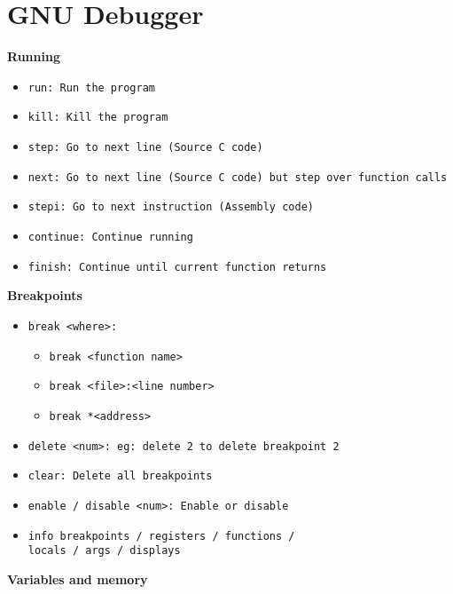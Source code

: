 \section{GNU Debugger}

\textbf{Running}
\begin{itemize}[noitemsep, topsep=1pt]
    \item \tt{run}: Run the program
    \item \tt{kill}: Kill the program
    \item \tt{step}: Go to next line (Source C code)
    \item \tt{next}: Go to next line (Source C code) but step over function calls
    \item \tt{stepi}: Go to next instruction (Assembly code)
    \item \tt{continue}: Continue running
    \item \tt{finish}: Continue until current function returns
\end{itemize}
\textbf{Breakpoints}
\begin{itemize}[noitemsep, topsep=1pt]
    \item \tt{break <where>}:
    \begin{itemize}[noitemsep, topsep=1pt]
        \item \tt{break <function name>}
        \item \tt{break <file>:<line number>}
        \item \tt{break *<address>}
    \end{itemize}
    \item \tt{delete <num>}: eg: \tt{delete 2} to delete breakpoint 2
    \item \tt{clear}: Delete all breakpoints
    \item \tt{enable / disable <num>}: Enable or disable
    \vspace{10pt}
    \item \tt{info breakpoints / registers / functions /\\locals / args / displays}
\end{itemize}
\textbf{Variables and memory}
